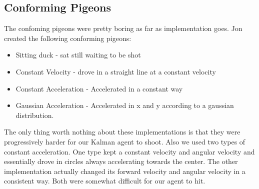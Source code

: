 \subsection{Conforming Pigeons}
The confoming pigeons were pretty boring as far as implementation goes. Jon created the following conforming pigeons:
\begin{itemize}
    \item Sitting duck - sat still waiting to be shot
    \item Constant Velocity - drove in a straight line at a constant velocity
    \item Constant Acceleration - Accelerated in a constant way
    \item Gaussian Acceleration - Accelerated in x and y according to a gaussian distribution.
\end{itemize}
The only thing worth nothing about these implementations is that they were progressively harder for our Kalman agent to shoot.  Also we used two types of constant acceleration.  One type kept a constant velocity and angular velocity and essentially drove in circles always accelerating towards the center.  The other implementation actually changed its forward velocity and angular velocity in a consistent way.  Both were somewhat difficult for our agent to hit.
